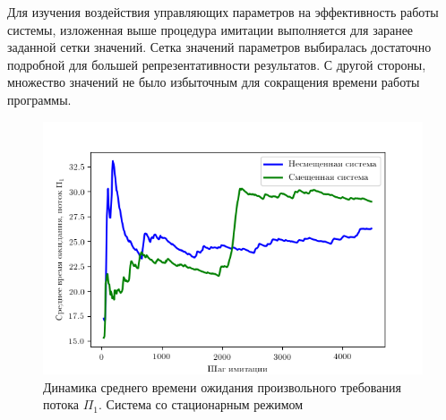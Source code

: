 Для изучения воздействия управляющих параметров на эффективность работы системы, изложенная выше процедура имитации выполняется для заранее заданной сетки значений. Сетка значений параметров выбиралась достаточно подробной для большей репрезентативности результатов. С другой стороны, множество значений не было избыточным для сокращения времени работы программы. 

\begin{figure}[t]
\centering
\includegraphics[scale=1]{Pictures/pic_firstTimeUntilServ_stationar.png} 
\caption{Динамика среднего времени ожидания произвольного требования потока $\Pi_1$. Система со стационарным режимом}
\label{Experiment:timeUntilServiceFirst:stationar}
\end{figure}

